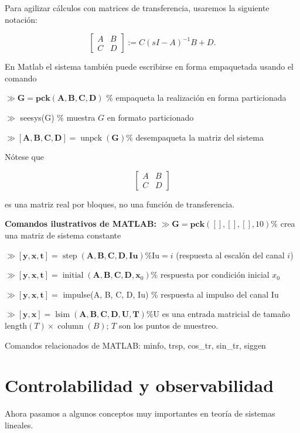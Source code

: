Para agilizar cálculos con matrices de transferencia, usaremos la siguiente notación:

$$
\left[\begin{array}{l|l}
A & B \\
\hline C & D
\end{array}\right]:=C(s I-A)^{-1} B+D .
$$

En Matlab el sistema también puede escribirse en forma empaquetada usando el comando

$\gg \mathbf{G}=\mathbf{p c k}(\mathbf{A}, \mathbf{B}, \mathbf{C}, \mathbf{D})$ \% empaqueta la realización en forma particionada

$\gg$ seesys(G) \% muestra $G$ en formato particionado

$\gg[\mathbf{A}, \mathbf{B}, \mathbf{C}, \mathbf{D}]=\operatorname{unpck}(\mathbf{G}) \%$ desempaqueta la matriz del sistema

Nótese que

$$
\left[\begin{array}{ll}
A & B \\
C & D
\end{array}\right]
$$

es una matriz real por bloques, no una función de transferencia.

\textbf{Comandos ilustrativos de MATLAB:}
$\gg \mathbf{G}=\mathbf{p c k}([],[],[], 10) \%$ crea una matriz de sistema constante

$\gg[\mathbf{y}, \mathbf{x}, \mathbf{t}]=\operatorname{step}(\mathbf{A}, \mathbf{B}, \mathbf{C}, \mathbf{D}, \mathbf{Iu}) \% \mathrm{Iu}=i$ (respuesta al escalón del canal $i$)

$\gg[\mathbf{y}, \mathbf{x}, \mathbf{t}]=\operatorname{initial}\left(\mathbf{A}, \mathbf{B}, \mathbf{C}, \mathbf{D}, \mathbf{x}_{0}\right) \%$ respuesta por condición inicial $x_{0}$

$\gg[\mathbf{y}, \mathbf{x}, \mathbf{t}]=$ impulse(A, B, C, D, Iu) \% respuesta al impulso del canal Iu

$\gg[\mathbf{y}, \mathbf{x}]=\operatorname{lsim}(\mathbf{A}, \mathbf{B}, \mathbf{C}, \mathbf{D}, \mathbf{U}, \mathbf{T}) \% \mathrm{U}$ es una entrada matricial de tamaño length$(T) \times \operatorname{column}(B)$; $T$ son los puntos de muestreo.

Comandos relacionados de MATLAB: minfo, trsp, cos\_tr, sin\_tr, siggen

\section{Controlabilidad y observabilidad}
Ahora pasamos a algunos conceptos muy importantes en teoría de sistemas lineales.

